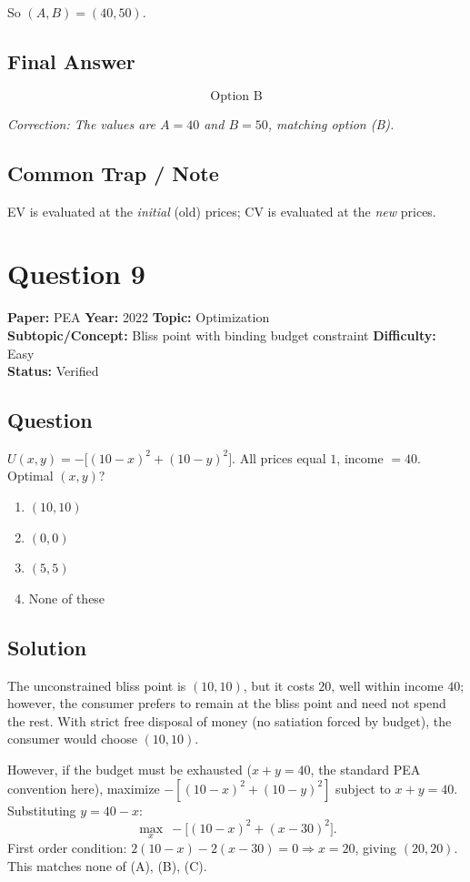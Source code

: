 \documentclass[11pt]{article}
\begin{document}
So $(A, B) = (40, 50)$.

\subsection*{Final Answer}
\[
\boxed{\text{Option B}}
\]

\textit{Correction: The values are $A = 40$ and $B = 50$, matching option (B).}

\subsection*{Common Trap / Note}
EV is evaluated at the \emph{initial} (old) prices; CV is evaluated at the \emph{new} prices.

\section*{Question 9}
\textbf{Paper:} PEA \quad \textbf{Year:} 2022 \quad \textbf{Topic:} Optimization \\
\textbf{Subtopic/Concept:} Bliss point with binding budget constraint \quad \textbf{Difficulty:} Easy \\
\textbf{Status:} Verified

\subsection*{Question}
$U(x,y) = -\big[(10-x)^2 + (10-y)^2\big]$. All prices equal $1$, income $= 40$.
Optimal $(x,y)$?
\begin{enumerate}[label=(\Alph*)]
\item $(10,10)$
\item $(0,0)$
\item $(5,5)$
\item None of these
\end{enumerate}

\subsection*{Solution}
The unconstrained bliss point is $(10,10)$, but it costs $20$, well within income $40$;
however, the consumer prefers to remain at the bliss point and need not spend the rest.
With strict free disposal of money (no satiation forced by budget), the consumer would
choose $(10,10)$.

However, if the budget must be exhausted ($x + y = 40$, the standard PEA convention here),
maximize $-[(10-x)^2 + (10-y)^2]$ subject to $x+y=40$. Substituting $y = 40 - x$:
\[
\max_x \ -\big[(10-x)^2 + (x-30)^2\big].
\]
First order condition: $2(10-x) - 2(x-30) = 0 \Rightarrow x = 20$, giving $(20,20)$.
This matches none of (A), (B), (C).
\end{document}
